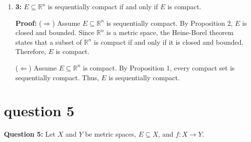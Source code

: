 \documentclass{article}
\begin{document}
\begin{enumerate}
    \item \textbf{3:} \( E \subseteq \mathbb{R}^n \) is sequentially compact if and only if \( E \) is compact.
    
    \textbf{Proof:} (\(\Rightarrow\)) Assume \( E \subseteq \mathbb{R}^n \) is sequentially compact. By Proposition 2, \( E \) is closed and bounded. Since \( \mathbb{R}^n \) is a metric space, the Heine-Borel theorem states that a subset of \( \mathbb{R}^n \) is compact if and only if it is closed and bounded. Therefore, \( E \) is compact.
    
    (\(\Leftarrow\)) Assume \( E \subseteq \mathbb{R}^n \) is compact. By Proposition 1, every compact set is sequentially compact. Thus, \( E \) is sequentially compact.
\end{enumerate}

\section{question 5}
\textbf{Question 5:} Let \(X\) and \(Y\) be metric spaces, \(E \subseteq X\), and \(f : X \to Y\).
\end{document}
